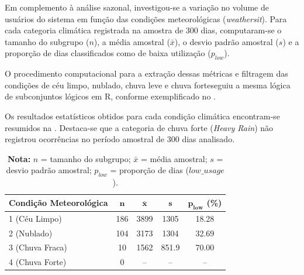 \documentclass[12pt,a4paper]{article}
\begin{document}
Em complemento à análise sazonal, investigou-se a variação no volume de usuários do sistema em função das condições meteorológicas (\textit{weathersit}). Para cada categoria climática registrada na amostra de 300 dias, computaram-se o tamanho do subgrupo ($n$), a média amostral ($\bar{x}$), o desvio padrão amostral ($s$) e a proporção de dias classificados como de baixa utilização ($p_{low}$).

O procedimento computacional para a extração dessas métricas e filtragem das condições de céu limpo, nublado, chuva leve e chuva forteseguiu a mesma lógica de subconjuntos lógicos em R, conforme exemplificado no .


Os resultados estatísticos obtidos para cada condição climática encontram-se resumidos na . Destaca-se que a categoria de chuva forte (\textit{Heavy Rain}) não registrou ocorrências no período amostral de 300 dias analisado.

\begin{table}[H]
    \centering
    \caption{Indicadores estatísticos do volume de usuários categorizados por condição meteorológica.}
    \label{tab:meteorologia}
    \begin{tabular}{lcccc}
        \toprule
        \textbf{Condição Meteorológica} & $\boldsymbol{n}$ & $\boldsymbol{\bar{x}}$ & $\boldsymbol{s}$ & $\boldsymbol{p_{low}}$ \textbf{(\%)} \\
        \midrule
        1 (Céu Limpo)        & 186 & 3899   & 1305  & 18.28 \\
        2 (Nublado)         & 104 & 3173   & 1304  & 32.69 \\
        3 (Chuva Fraca) & 10  & 1562   & 851.9 & 70.00 \\
        4 (Chuva Forte) & 0   & --     & --    & --    \\
        \bottomrule
    \end{tabular}
    \vspace{2mm}
    \caption*{\small{\textbf{Nota:} $n$ = tamanho do subgrupo; $\bar{x}$ = média amostral; $s$ = desvio padrão amostral; $p_{low}$ = proporção de dias ($low\_usage$).}}
\end{table}
\end{document}
